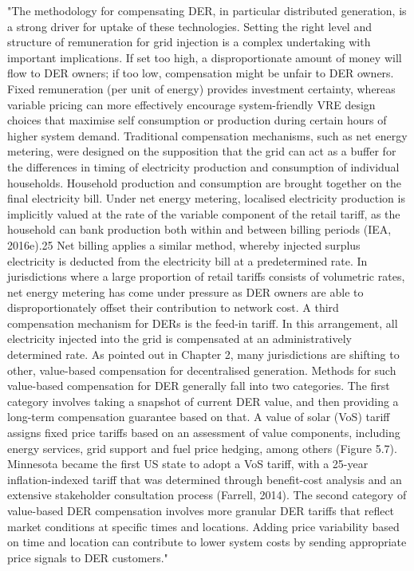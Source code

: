 "The methodology for compensating DER, in particular distributed generation, is a strong driver for uptake of these technologies. Setting the right level and structure of remuneration for grid injection is a complex undertaking with important implications. If set too high, a disproportionate amount of money will flow to DER owners; if too low, compensation might be unfair to DER owners. Fixed remuneration (per unit of energy) provides investment certainty, whereas variable pricing can more effectively encourage system-friendly VRE design choices that maximise self consumption or production during certain hours of higher system demand. Traditional compensation mechanisms, such as net energy metering, were designed on the supposition that the grid can act as a buffer for the differences in timing of electricity production and consumption of individual households. Household production and consumption are brought together on the final electricity bill. Under net energy metering, localised electricity production is implicitly valued at the rate of the variable component of the retail tariff, as the household can bank production both within and between billing periods (IEA, 2016e).25 Net billing applies a similar method, whereby injected surplus electricity is deducted from the electricity bill at a predetermined rate. In jurisdictions where a large proportion of retail tariffs consists of volumetric rates, net energy metering has come under pressure as DER owners are able to disproportionately offset their contribution to network cost. A third compensation mechanism for DERs is the feed-in tariff. In this arrangement, all electricity injected into the grid is compensated at an administratively determined rate. As pointed out in Chapter 2, many jurisdictions are shifting to other, value-based compensation for decentralised generation. Methods for such value-based compensation for DER generally fall into two categories. The first category involves taking a snapshot of current DER value, and then providing a long-term compensation guarantee based on that. A value of solar (VoS) tariff assigns fixed price tariffs based on an assessment of value components, including energy services, grid support and fuel price hedging, among others (Figure 5.7). Minnesota became the first US state to adopt a VoS tariff, with a 25-year inflation-indexed tariff that was determined through benefit-cost analysis and an extensive stakeholder consultation process (Farrell, 2014). The second category of value-based DER compensation involves more granular DER tariffs that reflect market conditions at specific times and locations. Adding price variability based on time and location can contribute to lower system costs by sending appropriate price signals to DER customers." \cite{international_energy_agency_status_2017}

